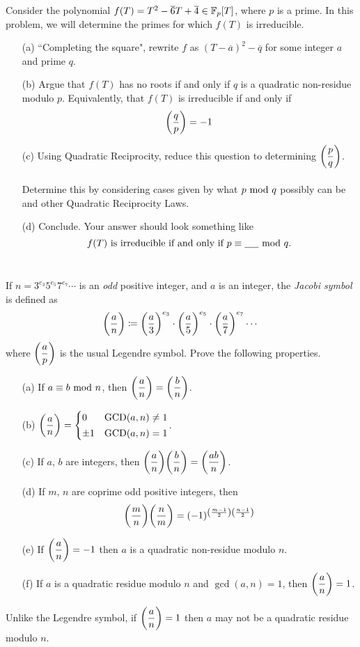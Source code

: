 \begin{problem}\label{Problem 17.1}
Consider the polynomial $f(T) = T^2 - \overline{6}T + \overline{4} \in \mathbb F_p[T]$, where $p$ is a prime. In this problem, we will determine the primes for which $f(T)$ is irreducible. 
\begin{itemize}[itemsep=1em]
\item[(a)] ``Completing the square", rewrite $f$ as $(T-\overline{a})^2 - \overline{q}$ for some integer $a$ and prime $q$.
\item[(b)] Argue that $f(T)$ has no roots if and only if $q$ is a quadratic non-residue modulo $p$. Equivalently, that $f(T)$ is irreducible if and only if
\[\bigg(\dfrac{q}{p}\bigg) = -1\]
\item[(c)] Using Quadratic Reciprocity, reduce this question to determining $\bigg(\dfrac{p}{q}\bigg)$.\\
\\
Determine this by considering cases given by what $p\text{ mod }{q}$ possibly can be and other Quadratic Reciprocity Laws.
\item[(d)] Conclude. Your answer should look something like \[f(T) \text{ is irreducible if and only if }p \equiv \underline{\text{\color{white}ans}}\modar{q}.\]\\[-2em]
\end{itemize}
\end{problem}

\vspace{0.1in}

\begin{problem}\label{Problem 17.2}
If $n = 3^{e_3}5^{e_5}7^{e_7}\cdots$ is an \emph{odd} positive integer, and $a$ is an integer, the \emph{Jacobi symbol} is defined as
\[\bigg(\dfrac{a}{n}\bigg) \coloneqq \bigg(\dfrac{a}{3}\bigg)^{e_3}\cdot \bigg(\dfrac{a}{5}\bigg)^{e_5}\cdot \bigg(\dfrac{a}{7}\bigg)^{e_7}\cdots\]
where $\bigg(\dfrac{a}{p}\bigg)$ is the usual Legendre symbol. Prove the following properties.
\begin{itemize}[itemsep=1em]
\item[(a)] If $a \equiv b \text{ mod }{n}$, then $\bigg(\dfrac{a}{n}\bigg) = \bigg(\dfrac{b}{n}\bigg)$.
\item[(b)] $\bigg(\dfrac{a}{n}\bigg) = \begin{cases} 0 & \operatorname{GCD}(a,n) \neq 1\\[0.2em] \pm 1 & \operatorname{GCD}(a,n) =1 \end{cases}$.
\item[(c)] If $a,\,b$ are integers, then $\bigg(\dfrac{a}{n}\bigg)\bigg(\dfrac{b}{n}\bigg) = \bigg(\dfrac{ab}{n}\bigg)$.
\item[(d)] If $m,\,n$ are coprime odd positive integers, then
\[\bigg(\dfrac{m}{n}\bigg)\bigg(\dfrac{n}{m}\bigg) = (-1)^{\left(\frac{m-1}{2}\right)\left(\frac{n-1}{2}\right)}\]
\item[(e)] If $\bigg(\dfrac{a}{n}\bigg) = -1$ then $a$ is a quadratic non-residue modulo $n$.
\item[(f)] If $a$ is a quadratic residue modulo $n$ and $\gcd(a,n) = 1$, then $\bigg(\dfrac{a}{n}\bigg) = 1$.
\end{itemize}
Unlike the Legendre symbol, if $\bigg(\dfrac{a}{n}\bigg) = 1$ then $a$ may not be a quadratic residue modulo $n$.
\end{problem}